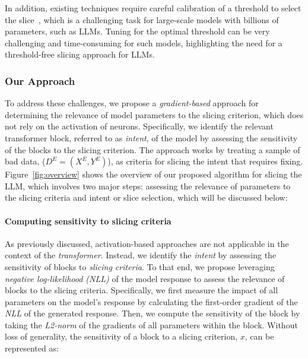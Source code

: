 In addition, existing techniques require careful calibration of a threshold to select the slice~\cite{zhang2022remos,zhang2020dynamic}, which is a challenging task for large-scale models with billions of parameters, such as LLMs. Tuning for the optimal threshold can be very challenging and time-consuming for such models, highlighting the need for a threshold-free slicing approach for LLMs.



\subsubsection{Our Approach}
To address these challenges, we propose a \textit{gradient-based} approach for determining the relevance of model parameters to the slicing criterion, which does not rely on the activation of neurons. Specifically, we identify the relevant transformer block, referred to as \textit{intent}, of the model by assessing the sensitivity of the blocks to the slicing criterion. The approach works by treating a sample of bad data, ($D^E=(X^E, Y^E)$),  as criteria for slicing the intent that requires fixing. Figure~\ref{fig:overview} shows the overview of our proposed algorithm for slicing the LLM, which involves two major steps: assessing the relevance of parameters to the slicing criteria and intent or slice selection, which will be discussed below:



\paragraph{Computing sensitivity to slicing criteria}
As previously discussed, activation-based approaches are not applicable in the context of the \textit{transformer}. Instead, we identify the \textit{intent} by assessing the sensitivity of blocks to \textit{slicing criteria}. To that end, we propose leveraging \textit{negative log-likelihood (NLL)} of the model response to assess the relevance of blocks to the slicing criteria. Specifically, we first measure the impact of all parameters on the model's response by calculating the first-order gradient of the \textit{NLL} of the generated response. Then, we compute the sensitivity of the block by taking the \textit{L2-norm} of the gradients of all parameters within the block. Without loss of generality, the sensitivity of a block to a slicing criterion, $x$, can be represented as:




